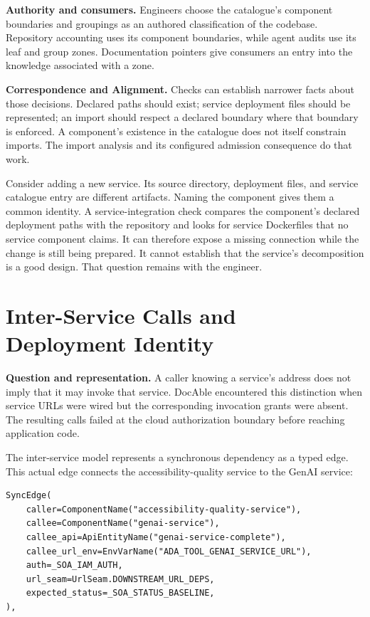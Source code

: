 \textbf{Authority and consumers.} Engineers choose the catalogue’s component boundaries and groupings as an authored classification of the codebase. Repository accounting uses its component boundaries, while agent audits use its leaf and group zones. Documentation pointers give consumers an entry into the knowledge associated with a zone.

\textbf{Correspondence and Alignment.} Checks can establish narrower facts about those decisions. Declared paths should exist; service deployment files should be represented; an import should respect a declared boundary where that boundary is enforced. A component's existence in the catalogue does not itself constrain imports. The import analysis and its configured admission consequence do that work.

Consider adding a new service. Its source directory, deployment files, and service catalogue entry are different artifacts. Naming the component gives them a common identity. A service-integration check compares the component's declared deployment paths with the repository and looks for service Dockerfiles that no service component claims. It can therefore expose a missing connection while the change is still being prepared. It cannot establish that the service's decomposition is a good design. That question remains with the engineer.

\section{Inter-Service Calls and Deployment Identity}\label{heading:handbook-model-service-flow}

\textbf{Question and representation.} A caller knowing a service's address does not imply that it may invoke that service. DocAble encountered this distinction when service URLs were wired but the corresponding invocation grants were absent. The resulting calls failed at the cloud authorization boundary before reaching application code.

The inter-service model represents a synchronous dependency as a typed edge. This actual edge connects the accessibility-quality service to the GenAI service:

\begin{verbatim}
SyncEdge(
    caller=ComponentName("accessibility-quality-service"),
    callee=ComponentName("genai-service"),
    callee_api=ApiEntityName("genai-service-complete"),
    callee_url_env=EnvVarName("ADA_TOOL_GENAI_SERVICE_URL"),
    auth=_SOA_IAM_AUTH,
    url_seam=UrlSeam.DOWNSTREAM_URL_DEPS,
    expected_status=_SOA_STATUS_BASELINE,
),
\end{verbatim}

